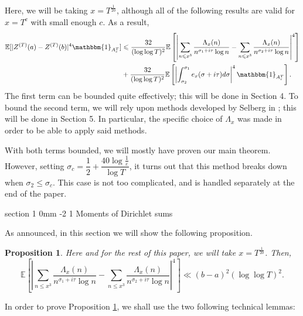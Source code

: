 \documentclass{article}
\makeatletter
\newcommand{\1}{\mathds{1}}
\numberwithin{equation}{section}
\newcommand{\eps}{\varepsilon}
\renewcommand{\leq}{\leqslant}
\newcommand{\E}{\mathbb{E}}
\theoremstyle{plain} %
\newtheorem{proposition}[theorem]{Proposition}
\renewcommand{\section}{\@startsection
{section}%
{1}%
{0mm}%
{-2\baselineskip}%
{1\baselineskip}%
{\normalfont\large\scshape\centering}} %
\makeatother
\begin{document}
\noindent Here, we will be taking $x = T^{\frac{1}{20}}$, although all of the following results are valid for $x = T^{c}$ with small enough $c$. As a result,
\begin{equation}
\label{termstobound}
    \begin{split}
        \E[|Z^{(T)}(a) - Z^{(T)}(b)|^4 \mathbbm{1}_{A_\eps^T}] & \leq \dfrac{32}{(\log \log T)^2}\E \left[\left|\sum_{n \leq x^3} \frac{\Lambda_x(n)}{n^{\sigma_1 + i \tau} \log n} - \sum_{n \leq x^3} \frac{\Lambda_x(n)}{n^{\sigma_2 + i \tau} \log n} \right|^4 \right] \\
        & + \dfrac{32}{(\log \log T)^2} \E \left[\left|\int_{\sigma_2}^{\sigma_1}e_x(\sigma + i \tau) d \sigma \right|^4\mathbbm{1}_{A_\eps^T}\right].
    \end{split}
\end{equation}
The first term can be bounded quite effectively; this will be done in Section 4. To bound the second term, we will rely upon methods developed by Selberg in \cite{Sel1946}; this will be done in Section 5. In particular, the specific choice of $\Lambda_x$ was made in order to be able to apply said methods.  

With both terms bounded, we will mostly have proven our main theorem. However, setting $\sigma_c =  \dfrac{1}{2} + \dfrac{40 \log \frac{1}{\eps}}{\log T}$, it turns out that this method breaks down when $\sigma_2 \leq \sigma_c$. This case is not too complicated, and is handled separately at the end of the paper.

\section{Moments of Dirichlet sums}

As announced, in this section we will show the following proposition.

\begin{proposition}
\label{lemma}
Here and for the rest of this paper, we will take $x = T^{\frac{1}{20}}$. Then,
    \begin{equation}
        \E \left[\left|\sum_{n \leq x^3} \frac{\Lambda_x(n)}{n^{\sigma_1 + i \tau} \log n} - \sum_{n \leq x^3} \frac{\Lambda_x(n)}{n^{\sigma_2 + i \tau} \log n} \right|^4 \right] \ll (b-a)^2 (\log \log T)^2.
    \end{equation}
\end{proposition}

In order to prove Proposition \ref{lemma}, we shall use the two following technical lemmas:
\end{document}
